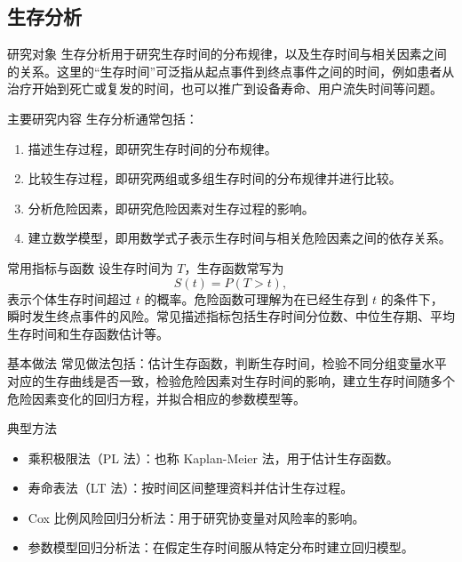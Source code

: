 \documentclass[UTF8,zihao=-4,fontset=fandol]{ctexart}
\begin{document}
\subsection{生存分析}

\begin{keybox}{研究对象}
生存分析用于研究生存时间的分布规律，以及生存时间与相关因素之间的关系。这里的“生存时间”可泛指从起点事件到终点事件之间的时间，例如患者从治疗开始到死亡或复发的时间，也可以推广到设备寿命、用户流失时间等问题。
\end{keybox}

\begin{methodbox}{主要研究内容}
生存分析通常包括：
\begin{enumerate}
  \item 描述生存过程，即研究生存时间的分布规律。
  \item 比较生存过程，即研究两组或多组生存时间的分布规律并进行比较。
  \item 分析危险因素，即研究危险因素对生存过程的影响。
  \item 建立数学模型，即用数学式子表示生存时间与相关危险因素之间的依存关系。
\end{enumerate}
\end{methodbox}

\begin{keybox}{常用指标与函数}
设生存时间为 $T$，生存函数常写为
\[
S(t)=P(T>t),
\]
表示个体生存时间超过 $t$ 的概率。危险函数可理解为在已经生存到 $t$ 的条件下，瞬时发生终点事件的风险。常见描述指标包括生存时间分位数、中位生存期、平均生存时间和生存函数估计等。
\end{keybox}

\begin{methodbox}{基本做法}
常见做法包括：估计生存函数，判断生存时间，检验不同分组变量水平对应的生存曲线是否一致，检验危险因素对生存时间的影响，建立生存时间随多个危险因素变化的回归方程，并拟合相应的参数模型等。
\end{methodbox}

\begin{methodbox}{典型方法}
\begin{itemize}
  \item 乘积极限法（PL 法）：也称 Kaplan-Meier 法，用于估计生存函数。
  \item 寿命表法（LT 法）：按时间区间整理资料并估计生存过程。
  \item Cox 比例风险回归分析法：用于研究协变量对风险率的影响。
  \item 参数模型回归分析法：在假定生存时间服从特定分布时建立回归模型。
\end{itemize}
\end{methodbox}
\end{document}
